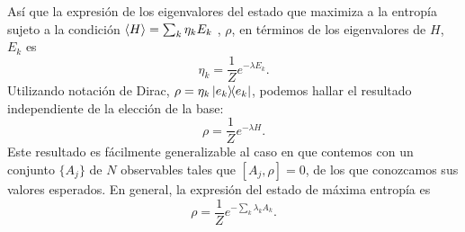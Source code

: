 Así que la expresión de los eigenvalores del estado que maximiza a la entropía sujeto a la condición $\expval{H}=\sum_{k}\eta_{k}E_{k}$ , $\rho$, en términos de los eigenvalores de $H$, $E_{k}$ es
\begin{equation}
    \eta_{k}=\frac{1}{Z}e^{-\lambda E_{k}}.\nonumber
\end{equation}
Utilizando notación de Dirac, $\rho=\eta_{k}\dyad{e_{k}}$, podemos hallar el resultado independiente de la elección de la base:
\begin{equation}
    \rho=\frac{1}{Z}e^{-\lambda H}.
\end{equation}
Este resultado es fácilmente generalizable al caso en que contemos con un  conjunto $\{A_{j}\}$ de $N$ observables tales que $[A_{j},\rho]=0$,\ddnote{,} de los que conozcamos sus valores esperados. En general, la expresión del estado de máxima entropía es
\begin{equation}
    \rho=\frac{1}{Z}e^{-\sum_{k}\lambda_{k} A_{k}}.
\end{equation}
